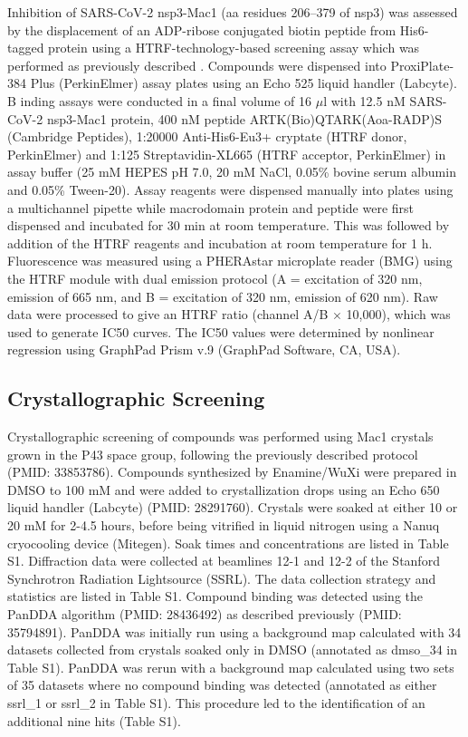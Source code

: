 Inhibition of SARS-CoV-2 nsp3-Mac1 (aa residues 206–379 of nsp3) was assessed by the displacement of an ADP-ribose conjugated biotin peptide from His6-tagged protein using a HTRF-technology-based screening assay which was performed as previously described \cite{Schuller2021Mac1Frag}. Compounds were dispensed into ProxiPlate-384 Plus (PerkinElmer) assay plates using an Echo 525 liquid handler (Labcyte). B      inding assays were conducted in a final volume of 16 $\mu$l with 12.5 nM SARS-CoV-2 nsp3-Mac1 protein, 400 nM peptide ARTK(Bio)QTARK(Aoa-RADP)S (Cambridge Peptides), 1:20000 Anti-His6-Eu3+ cryptate (HTRF donor, PerkinElmer) and 1:125 Streptavidin-XL665 (HTRF acceptor, PerkinElmer) in assay buffer (25 mM HEPES pH 7.0, 20 mM NaCl, 0.05\% bovine serum albumin and 0.05\% Tween-20). Assay reagents were dispensed manually into plates using a multichannel pipette while macrodomain protein and peptide were first dispensed and incubated for 30 min at room temperature. This was followed by addition of the HTRF reagents and incubation at room temperature for 1 h. Fluorescence was measured using a PHERAstar microplate reader (BMG) using the HTRF module with dual emission protocol (A = excitation of 320 nm, emission of 665 nm, and B = excitation of 320 nm, emission of 620 nm). Raw data were processed to give an HTRF ratio (channel A/B $\times$ 10,000), which was used to generate IC50 curves. The IC50 values were determined by nonlinear regression using GraphPad Prism v.9 (GraphPad Software, CA, USA).

\subsection{Crystallographic Screening} \label{subsec:crystallography}
Crystallographic screening of compounds was performed using Mac1 crystals grown in the P43 space group, following the previously described protocol (PMID: 33853786). Compounds synthesized by Enamine/WuXi were prepared in DMSO to 100 mM and were added to crystallization drops using an Echo 650 liquid handler (Labcyte) (PMID: 28291760). Crystals were soaked at either 10 or 20 mM for 2-4.5 hours, before being vitrified in liquid nitrogen using a Nanuq cryocooling device (Mitegen). Soak times and concentrations are listed in Table S1. Diffraction data were collected at beamlines 12-1 and 12-2 of the Stanford Synchrotron Radiation Lightsource (SSRL). The data collection strategy and statistics are listed in Table S1. Compound binding was detected using the PanDDA algorithm (PMID: 28436492) as described previously (PMID: 35794891). PanDDA was initially run using a background map calculated with 34 datasets collected from crystals soaked only in DMSO (annotated as dmso\_34 in Table S1). PanDDA was rerun with a background map calculated using two sets of 35 datasets where no compound binding was detected (annotated as either ssrl\_1 or ssrl\_2 in Table S1). This procedure led to the identification of an additional nine hits (Table S1). 

